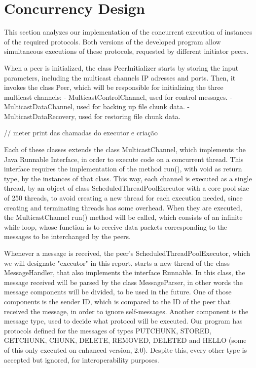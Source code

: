 \documentclass[11pt]{article}
\begin{document}
\section{Concurrency Design}

This section analyzes our implementation of the concurrent execution of instances of the required protocols.
Both versions of the developed program allow simultaneous executions of these protocols, requested by different initiator peers.

When a peer is initialized, the class PeerInitializer starts by storing the input parameters, including the multicast channels IP adresses and ports.
Then, it invokes the class Peer, which will be responsible for initializing the three multicast channels:
 - MulticastControlChannel, used for control messages.
 - MulticastDataChannel, used for backing up file chunk data.
 - MulticastDataRecovery, used for restoring file chunk data.

// meter print das chamadas do executor e criação

Each of these classes extends the class MulticastChannel, which implements the Java Runnable Interface, in order to execute code on a concurrent thread.
This interface requires the implementation of the method run(), with void as return type, by the instances of that class.
This way, each channel is executed as a single thread, by an object of class ScheduledThreadPoolExecutor with a core pool size of 250 threads, to avoid creating a new thread for each execution needed, since creating and terminating threads has some overhead.
When they are executed, the MulticastChannel run() method will be called, which consists of an infinite while loop, whose function is to receive data packets corresponding to the messages to be interchanged by the peers.

Whenever a message is received, the peer's ScheduledThreadPoolExecutor, which we will designate "executor" in this report, starts a new thread of the class MessageHandler, that also implements the interface Runnable.
In this class, the message received will be parsed by the class MessageParser, in other words the message components will be divided, to be used in the future.
One of those components is the sender ID, which is compared to the ID of the peer that received the message, in order to ignore self-messages.
Another component is the message type, used to decide what protocol will be executed. Our program has protocols defined for the messages of types PUTCHUNK, STORED, GETCHUNK, CHUNK, DELETE, REMOVED, DELETED and HELLO (some of this only executed on enhanced version, 2.0).
Despite this, every other type is accepted but ignored, for interoperability purposes.
\end{document}
